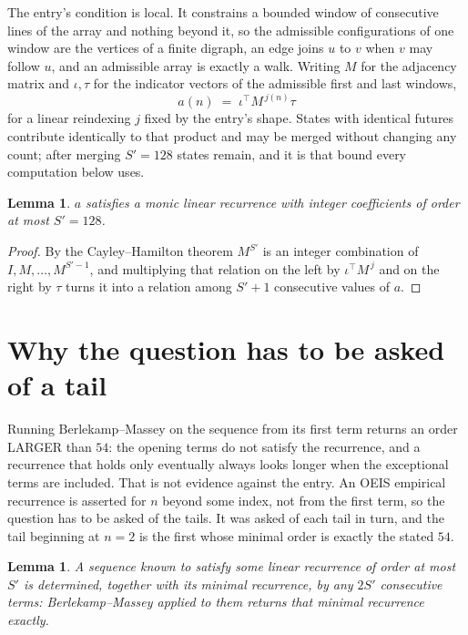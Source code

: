 \documentclass[11pt,a4paper]{article}
\theoremstyle{plain}
\newtheorem{lemma}[theorem]{Lemma}
\theoremstyle{definition}
\begin{document}
The entry's condition is local. It constrains a bounded window of consecutive lines of the
array and nothing beyond it, so the admissible configurations of one window are the vertices of
a finite digraph, an edge joins $u$ to $v$ when $v$ may follow $u$, and an admissible array is
exactly a walk. Writing $M$ for the adjacency matrix and $\iota,\tau$ for the indicator vectors
of the admissible first and last windows,
\[
a(n)\;=\;\iota^{\!\top}M^{\,j(n)}\tau
\]
for a linear reindexing $j$ fixed by the entry's shape. States with identical futures
contribute identically to that product and may be merged without changing any count; after
merging $S'=128$ states remain, and it is that bound every computation below uses.

\begin{lemma}\label{lem:cf}
$a$ satisfies a monic linear recurrence with integer coefficients of order at most $S'=128$.
\end{lemma}

\begin{proof}
By the Cayley--Hamilton theorem $M^{S'}$ is an integer combination of $I,M,\dots,M^{S'-1}$,
and multiplying that relation on the left by $\iota^{\!\top}M^{\,j}$ and on the right by
$\tau$ turns it into a relation among $S'+1$ consecutive values of $a$.
\end{proof}

\section{Why the question has to be asked of a tail}

Running Berlekamp--Massey on the sequence from its first term returns an order LARGER than $54$: the opening terms do not satisfy the recurrence, and a recurrence that holds only eventually always looks longer when the exceptional terms are included. That is not evidence against the entry. An OEIS empirical recurrence is asserted for $n$ beyond some index, not from the first term, so the question has to be asked of the tails. It was asked of each tail in turn, and the tail beginning at $n=2$ is the first whose minimal order is exactly the stated $54$.

\begin{lemma}\label{lem:bm}
A sequence known to satisfy some linear recurrence of order at most $S'$ is determined,
together with its minimal recurrence, by any $2S'$ consecutive terms: Berlekamp--Massey applied
to them returns that minimal recurrence exactly.
\end{lemma}
\end{document}
